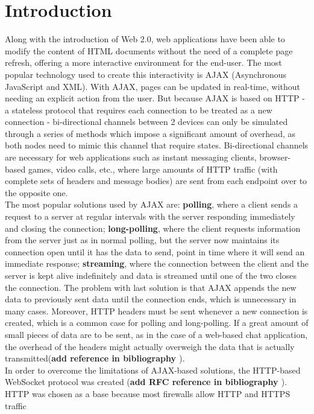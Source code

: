 \documentclass[conference]{IEEEtran}
\begin{document}
\section{Introduction}
Along with the introduction of Web 2.0, web applications have been able to
modify the content of HTML documents without the need of a complete page
refresh, offering a more interactive environment for the end-user.
The most popular technology used to create this interactivity is AJAX
(Asynchronous JavaScript and XML). With AJAX, pages can be updated in real-time,
without needing an explicit action from the user. But because AJAX is based on
HTTP - a stateless protocol that requires each connection to be treated as a new
connection - bi-directional channels between 2 devices can only be simulated
through a series of methods which impose a significant amount of overhead, as both
nodes need to mimic this channel that require states.
Bi-directional channels are necessary for web applications such as instant
messaging clients, browser-based games, video calls, etc., where large amounts
of HTTP traffic (with complete sets of headers and message bodies) are sent from
each endpoint over to the opposite one.
\\
\indent
The most popular solutions used by AJAX are: \textbf{polling}, where a client sends
a request to a server at regular intervals with the server responding immediately
and closing the connection; \textbf{long-polling}, where the client requests
information from the server just as in normal polling, but the server now maintains
its connection open until it has the data to send, point in time where
it will send an immediate response;
\textbf{streaming}, where the connection between the client and the server is
kept alive indefinitely and data is streamed until one of the two closes the
connection. The problem with last solution is that AJAX
appends the new data to previously sent data until the connection ends, which is
unnecessary in many cases. Moreover, HTTP headers must be sent whenever a new
connection is created, which is a common case for polling and long-polling. If
a great amount of small pieces of data are to be sent, as in the case of a
web-based chat application, the overhead of the headers might actually overweigh
the data that is actually transmitted(\textbf{add reference in bibliography \cite{1}}).
\\
\indent
In order to overcome the limitations of AJAX-based solutions, the HTTP-based
WebSocket protocol was created (\textbf{add RFC reference in bibliography \cite{2}}).
HTTP was chosen as a base because most firewalls allow HTTP and HTTPS traffic 
\end{document}
